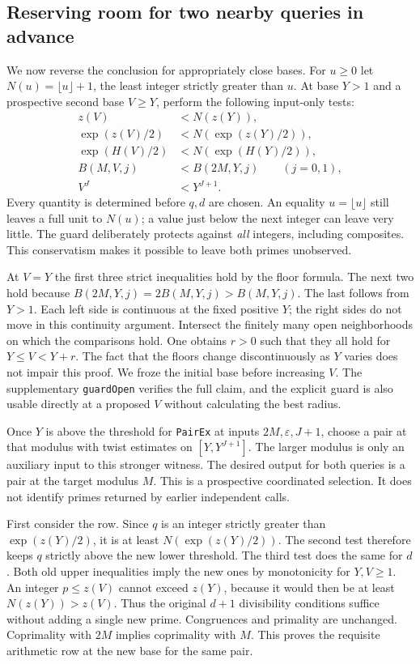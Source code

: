 \documentclass[12pt,letterpaper]{article}
\begin{document}
\subsection{Reserving room for two nearby queries in advance}

We now reverse the conclusion for appropriately close bases. For \(u\ge0\) let \(N(u)=\lfloor u\rfloor+1\), the least integer strictly greater than \(u\). At base \(Y>1\) and a prospective second base \(V\ge Y\), perform the following input-only tests:
\begin{align*}
 z(V)&<N(z(Y)),\\
 \exp(z(V)/2)&<N(\exp(z(Y)/2)),\\
 \exp(H(V)/2)&<N(\exp(H(Y)/2)),\\
 B(M,V,j)&<B(2M,Y,j) \qquad (j=0,1),\\
 V^J&<Y^{J+1}.
\end{align*}
Every quantity is determined before \(q,d\) are chosen. An equality \(u=\lfloor u\rfloor\) still leaves a full unit to \(N(u)\); a value just below the next integer can leave very little. The guard deliberately protects against \emph{all} integers, including composites. This conservatism makes it possible to leave both primes unobserved.

At \(V=Y\) the first three strict inequalities hold by the floor formula. The next two hold because \(B(2M,Y,j)=2B(M,Y,j)>B(M,Y,j)\). The last follows from \(Y>1\). Each left side is continuous at the fixed positive \(Y\); the right sides do not move in this continuity argument. Intersect the finitely many open neighborhoods on which the comparisons hold. One obtains \(r>0\) such that they all hold for \(Y\le V<Y+r\). The fact that the floors change discontinuously as \(Y\) varies does not impair this proof. We froze the initial base before increasing \(V\). The supplementary \texttt{guardOpen} verifies the full claim, and the explicit guard is also usable directly at a proposed \(V\) without calculating the best radius.

Once \(Y\) is above the threshold for \texttt{PairEx} at inputs \(2M,\varepsilon,J+1\), choose a pair at that modulus with twist estimates on \([Y,Y^{J+1}]\). The larger modulus is only an auxiliary input to this stronger witness. The desired output for both queries is a pair at the target modulus \(M\). This is a prospective coordinated selection. It does not identify primes returned by earlier independent calls.

First consider the row. Since \(q\) is an integer strictly greater than \(\exp(z(Y)/2)\), it is at least \(N(\exp(z(Y)/2))\). The second test therefore keeps \(q\) strictly above the new lower threshold. The third test does the same for \(d\). Both old upper inequalities imply the new ones by monotonicity for \(Y,V\ge1\). An integer \(p\le z(V)\) cannot exceed \(z(Y)\), because it would then be at least \(N(z(Y))>z(V)\). Thus the original \(d+1\) divisibility conditions suffice without adding a single new prime. Congruences and primality are unchanged. Coprimality with \(2M\) implies coprimality with \(M\). This proves the requisite arithmetic row at the new base for the same pair.
\end{document}
